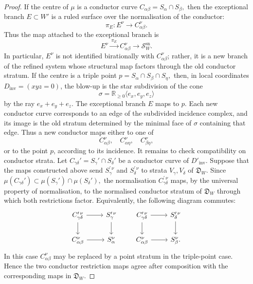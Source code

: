 \documentclass[11pt]{amsart}
\numberwithin{equation}{section}
\theoremstyle{plain}
\theoremstyle{definition}
\newcommand{\sn}{\mathrm{sn}}
\newcommand{\inv}{\mathrm{inv}}
\newcommand{\Dinv}{D_{\mathrm{inv}}}
\begin{document}
\begin{proof}
If the centre of \(\mu\) is a conductor curve
$
C_{\alpha\beta}=S_\alpha\cap S_\beta,
$
then the exceptional branch \(E\subset W'\) is a ruled surface over the
normalisation of the conductor:
\[
\pi_E:E^\nu\longrightarrow C_{\alpha\beta}^{\nu}.
\]
Thus the map attached to the exceptional branch is
\[
E^\nu \xrightarrow{\ \pi_E\ } C_{\alpha\beta}^{\nu}
\longrightarrow \mathscr S_W^{\sn}.
\]
In particular, \(E^\nu\) is not identified birationally with
\(C_{\alpha\beta}^{\nu}\); rather, it is a new branch of the refined
system whose structural map factors through the old conductor stratum.
If the centre is a triple point
$
p=S_\alpha\cap S_\beta\cap S_\eta,
$
then, in local coordinates \(\Dinv=(xyz=0)\), the blow-up is the star
subdivision of the cone
\[
\sigma=\mathbb R_{\geq 0}\langle e_x,e_y,e_z\rangle
\]
by the ray \(e_x+e_y+e_z\). The exceptional branch \(E\) maps to \(p\).
Each new conductor curve corresponds to an edge of the subdivided incidence
complex, and its image is the old stratum determined by the minimal face of
\(\sigma\) containing that edge. Thus a new conductor maps either to one of
\[
C_{\alpha\beta}^{\nu},\quad
C_{\alpha\eta}^{\nu},\quad
C_{\beta\eta}^{\nu},
\]
or to the point \(p\), according to its incidence.
It remains to check compatibility on conductor strata. Let
$
C_{\gamma\delta}'=S_\gamma'\cap S_\delta'
$ 
be a conductor curve of \(D'_{\inv}\). Suppose that the maps constructed
above send \(S_\gamma^{\prime\,\nu}\) and \(S_\delta^{\prime\,\nu}\) to
strata \(V_\gamma,V_\delta\) of \(\mathfrak D_W\). Since
$
\mu(C_{\gamma\delta}')\subset
\mu(S_\gamma')\cap\mu(S_\delta'),
$
the normalisation \(C_{\gamma\delta}^{\prime\,\nu}\) maps, by the universal
property of normalisation, to the normalised conductor stratum of
\(\mathfrak D_W\) through which both restrictions factor. Equivalently, the
following diagram commutes:
\[
\begin{tikzcd}
C_{\gamma\delta}^{\prime\,\nu}
\arrow[r] \arrow[d] &
S_\gamma^{\prime\,\nu}
\arrow[d]\\
C_{\alpha\beta}^{\nu}
\arrow[r] &
S_\alpha^\nu
\end{tikzcd}
\qquad
\begin{tikzcd}
C_{\gamma\delta}^{\prime\,\nu}
\arrow[r] \arrow[d] &
S_\delta^{\prime\,\nu}
\arrow[d]\\
C_{\alpha\beta}^{\nu}
\arrow[r] &
S_\beta^\nu.
\end{tikzcd}
\]
In this case \(C_{\alpha\beta}^{\nu}\) may be replaced by a point stratum in the
triple-point case. Hence the two conductor restriction maps agree after
composition with the corresponding maps in \(\mathfrak D_W\).


\end{proof}
\end{document}
